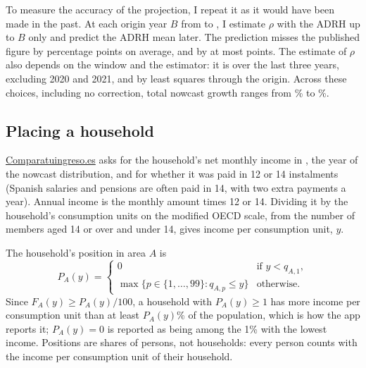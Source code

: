 To measure the accuracy of the projection, I repeat it as it would have been made in the past. At each origin year $B$ from \NowcastBtFirst{} to \NowcastBtLast{}, I estimate $\rho$ with the ADRH up to $B$ only and predict the ADRH mean \NowcastHorizon{} later. The prediction misses the published figure by \NowcastBtMAE{} percentage points on average, and by at most \NowcastBtMax{} points\NowcastBtOneAhead{}. The estimate of $\rho$ also depends on the window and the estimator: it is \RhoLastThree{} over the last three years, \RhoExclCovid{} excluding 2020 and 2021, and \RhoOrigin{} by least squares through the origin. Across these choices, including no correction, total nowcast growth ranges from \NowcastGrowthMin{}\% to \NowcastGrowthMax{}\%.

\subsection{Placing a household}\label{sec:placing}

\href{https://comparatuingreso.es/}{\mbox{Comparatuingreso.es}} asks for the household's net monthly income in \TargetYear{}, the year of the nowcast distribution, and for whether it was paid in 12 or 14 instalments (Spanish salaries and pensions are often paid in 14, with two extra payments a year). Annual income is the monthly amount times 12 or 14. Dividing it by the household's consumption units on the modified OECD scale, from the number of members aged 14 or over and under 14, gives income per consumption unit, $y$.

The household's position in area $A$ is
\begin{equation}
P_A(y) =
\begin{cases}
0 & \text{if } y < q_{A,1}, \\
\max\{p \in \{1, \dots, 99\} : q_{A,p} \le y\} & \text{otherwise.}
\end{cases}
\end{equation}
Since $F_A(y) \ge P_A(y)/100$, a household with $P_A(y) \ge 1$ has more income per consumption unit than at least $P_A(y)\%$ of the population, which is how the app reports it; $P_A(y) = 0$ is reported as being among the 1\% with the lowest income. Positions are shares of persons, not households: every person counts with the income per consumption unit of their household.
